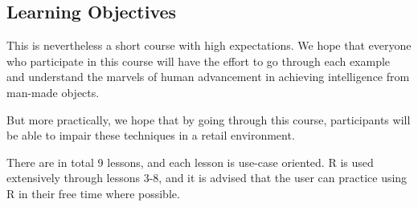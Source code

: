 \subsection{Learning Objectives}

This is nevertheless a short course with high expectations.  We hope that everyone who participate in this course will have the effort to go through each example and understand the marvels of human advancement in achieving intelligence from man-made objects.  

But more practically, we hope that by going through this course, participants will be able to impair these techniques in a retail environment.  

There are in total 9 lessons, and each lesson is use-case oriented.  R is used extensively through lessons 3-8, and it is advised that the user can practice using R in their free time where possible.  

\newpage